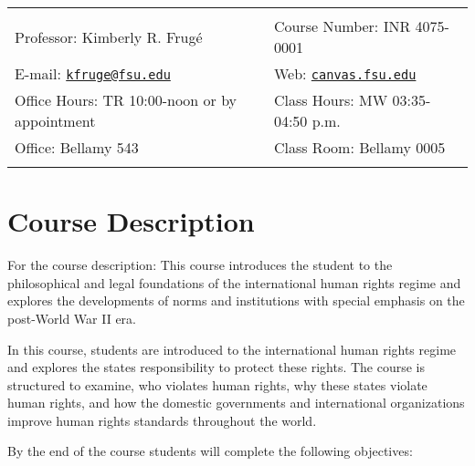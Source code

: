 \documentclass[11pt,]{article}
\title{\Huge\sc{International Human Rights}}
\date{Fall 2018}
\begin{document}
  


		\maketitle
		
	
		\thispagestyle{firststyle}



	\noindent \begin{tabular*}{\textwidth}{ @{\extracolsep{\fill}} ll @{\extracolsep{\fill}}}

\hline
&\\
Professor: Kimberly R. Frugé & Course Number: INR 4075-0001 \\  
E-mail: \texttt{\href{mailto:kfruge@fsu.edu}{\nolinkurl{kfruge@fsu.edu}}} & Web: \href{http://canvas.fsu.edu}{\tt canvas.fsu.edu}\\
Office Hours: TR 10:00-noon or by appointment  &  Class Hours: MW 03:35-04:50 p.m.\\
Office: Bellamy 543  & Class Room: Bellamy 0005\\
	&  \\
	\hline
	\end{tabular*}
	
\vspace{2mm}
	


\hypertarget{course-description}{%
\section{Course Description}\label{course-description}}

For the course description: This course introduces the student to the
philosophical and legal foundations of the international human rights
regime and explores the developments of norms and institutions with
special emphasis on the post-World War II era.

In this course, students are introduced to the international human
rights regime and explores the states responsibility to protect these
rights. The course is structured to examine, who violates human rights,
why these states violate human rights, and how the domestic governments
and international organizations improve human rights standards
throughout the world.

By the end of the course students will complete the following
objectives:
\end{document}
